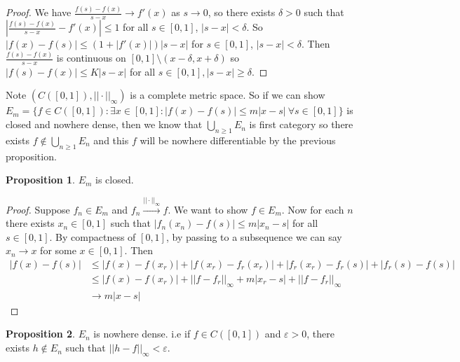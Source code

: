 \documentclass[a4paper, 10pt, twocolumn]{amsart}
\theoremstyle{definition}
\newtheorem*{proposition}{Proposition}
\newcommand{\eps}[0]{\varepsilon}
\newcommand{\too}{\xrightarrow}
\newcommand{\1}{\mathbbm{1}}
\begin{document}
\begin{proof}
    We have $\frac{f(s)-f(x)}{s-x} \to f'(x)$ as $s \to 0$, so there exists $\delta>0$ such that $\left|\frac{f(s)-f(x)}{s-x}-f'(x)\right| \le 1$ for all $s \in [0,1]$, $|s-x|<\delta$. So $|f(x)-f(s)| \le (1+|f'(x)|)|s-x|$ for $s \in [0,1]$, $|s-x| < \delta$. Then $\frac{f(s)-f(x)}{s-x}$ is continuous on $[0,1]\setminus (x-\delta,x+\delta)$ so $|f(s)-f(x)| \le K|s-x|$ for all $s \in [0,1], |s-x|\ge \delta$.
\end{proof}

Note $(C([0,1]),||\cdot||_\infty)$ is a complete metric space. So if we can show $E_m = \{f \in C([0,1]): \exists x \in [0,1] : |f(x)-f(s)| \le m|x-s| \ \forall s \in [0,1]\}$ is closed and nowhere dense, then we know that $\bigcup_{n\ge 1}E_n$ is first category so there exists $f \not \in \bigcup_{n\ge 1} E_n$ and this $f$ will be nowhere differentiable by the previous proposition.\\

\begin{proposition}
    $E_m$ is closed.
\end{proposition}

\begin{proof}
    Suppose $f_n \in E_m$ and $f_n \too{||\cdot||_\infty} f$. We want to show $f \in E_m$. Now for each $n$ there exists $x_n \in [0,1]$ such that $|f_n(x_n)-f(s)| \le m|x_n-s|$ for all $s \in [0,1]$. By compactness of $[0,1]$, by passing to a subsequence we can say $x_n \to x$ for some $x \in [0,1]$. Then \begin{align*}
        |f(x)-f(s)| &\le |f(x)-f(x_r)| + |f(x_r)-f_r(x_r)| + |f_r(x_r)-f_r(s)|+|f_r(s)-f(s)|\\
        &\le |f(x)-f(x_r)| + ||f-f_r||_\infty + m|x_r-s| + ||f-f_r||_\infty\\
        &\to m|x-s|
    \end{align*}
\end{proof}




\begin{proposition}
    $E_n$ is nowhere dense. i.e if $f \in C([0,1])$ and $\eps>0$, there exists $h\not \in E_n$ such that $||h-f||_\infty<\eps$.
\end{proposition}
\end{document}
